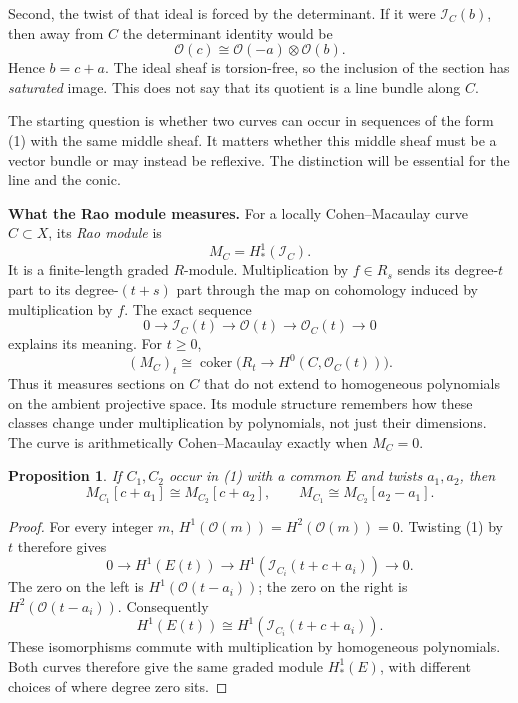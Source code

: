 \documentclass[11pt,a4paper]{article}
\newtheorem{proposition}{Proposition}[section]
\theoremstyle{remark}
\begin{document}
Second, the twist of that ideal is
forced by the determinant. If it were
$\mathcal{I}_C(b)$, then away from $C$
the determinant identity would be
$$
\mathcal{O}(c)
\cong\mathcal{O}(-a)\otimes\mathcal{O}(b).
$$
Hence $b=c+a$. The ideal sheaf is
torsion-free, so the inclusion of the
section has \emph{saturated} image.
This does not say that its quotient
is a line bundle along $C$.

The starting question is whether two
curves can occur in sequences of the
form (1) with the same middle sheaf.
It matters whether this middle sheaf
must be a vector bundle or may instead
be reflexive. The distinction will be
essential for the line and the conic.

\textbf{What the Rao module measures.}
For a locally Cohen--Macaulay curve
$C\subset X$, its \emph{Rao module} is
$$
M_C=H^1_*(\mathcal{I}_C).
$$
It is a finite-length graded $R$-module.
Multiplication by $f\in R_s$ sends its
degree-$t$ part to its degree-$(t+s)$
part through the map on cohomology
induced by multiplication by $f$.
The exact sequence
$$
0\longrightarrow\mathcal{I}_C(t)
\longrightarrow\mathcal{O}(t)
\longrightarrow\mathcal{O}_C(t)
\longrightarrow0
$$
explains its meaning. For $t\geq0$,
$$
(M_C)_t\cong\operatorname{coker}
\bigl(R_t\longrightarrow
H^0(C,\mathcal{O}_C(t))\bigr).
$$
Thus it measures sections on $C$ that
do not extend to homogeneous polynomials
on the ambient projective space.
Its module structure remembers how these
classes change under multiplication by
polynomials, not just their dimensions.
The curve is arithmetically
Cohen--Macaulay exactly when $M_C=0$.

\begin{proposition}
If $C_1,C_2$ occur in (1) with a common
$E$ and twists $a_1,a_2$, then
$$
M_{C_1}[c+a_1]\cong M_{C_2}[c+a_2],
\qquad
M_{C_1}\cong M_{C_2}[a_2-a_1].
$$
\end{proposition}
\begin{proof}
For every integer $m$,
$H^1(\mathcal{O}(m))=
H^2(\mathcal{O}(m))=0$.
Twisting (1) by $t$ therefore gives
$$
0\longrightarrow H^1(E(t))
\longrightarrow
H^1(\mathcal{I}_{C_i}(t+c+a_i))
\longrightarrow0.
$$
The zero on the left is
$H^1(\mathcal{O}(t-a_i))$;
the zero on the right is
$H^2(\mathcal{O}(t-a_i))$.
Consequently
$$
H^1(E(t))\cong
H^1(\mathcal{I}_{C_i}(t+c+a_i)).
$$
These isomorphisms commute with
multiplication by homogeneous
polynomials. Both curves therefore give
the same graded module $H^1_*(E)$,
with different choices of where degree
zero sits.
\end{proof}
\end{document}
